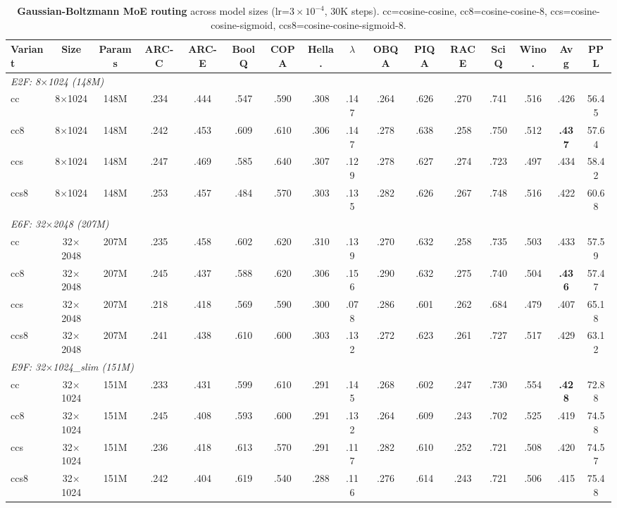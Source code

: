 \documentclass[oneside]{article}
\begin{document}
\begin{table}[t]
\centering
\caption{\textbf{Gaussian-Boltzmann MoE routing} across model sizes (lr=$3\times10^{-4}$, 30K steps). cc=cosine-cosine, cc8=cosine-cosine-8, ccs=cosine-cosine-sigmoid, ccs8=cosine-cosine-sigmoid-8.}
\label{tab:gaussboltz}
\begin{adjustbox}{max width=\textwidth}
\begin{tabular}{l|c|c|ccccccccccc|c|c}
\toprule
\textbf{Variant} & \textbf{Size} & \textbf{Params} & \textbf{ARC-C} & \textbf{ARC-E} & \textbf{BoolQ} & \textbf{COPA} & \textbf{Hella.} & \textbf{$\lambda$} & \textbf{OBQA} & \textbf{PIQA} & \textbf{RACE} & \textbf{SciQ} & \textbf{Wino.} & \textbf{Avg} & \textbf{PPL} \\
\midrule
\multicolumn{15}{l}{\textit{E2F: 8$\times$1024 (148M)}} \\
cc       & 8$\times$1024 & 148M & .234 & .444 & .547 & .590 & .308 & .147 & .264 & .626 & .270 & .741 & .516 & .426 & 56.45 \\
cc8      & 8$\times$1024 & 148M & .242 & .453 & .609 & .610 & .306 & .147 & .278 & .638 & .258 & .750 & .512 & \textbf{.437} & 57.64 \\
ccs      & 8$\times$1024 & 148M & .247 & .469 & .585 & .640 & .307 & .129 & .278 & .627 & .274 & .723 & .497 & .434 & 58.42 \\
ccs8     & 8$\times$1024 & 148M & .253 & .457 & .484 & .570 & .303 & .135 & .282 & .626 & .267 & .748 & .516 & .422 & 60.68 \\
\midrule
\multicolumn{15}{l}{\textit{E6F: 32$\times$2048 (207M)}} \\
cc       & 32$\times$2048 & 207M & .235 & .458 & .602 & .620 & .310 & .139 & .270 & .632 & .258 & .735 & .503 & .433 & 57.59 \\
cc8      & 32$\times$2048 & 207M & .245 & .437 & .588 & .620 & .306 & .156 & .290 & .632 & .275 & .740 & .504 & \textbf{.436} & 57.47 \\
ccs      & 32$\times$2048 & 207M & .218 & .418 & .569 & .590 & .300 & .078 & .286 & .601 & .262 & .684 & .479 & .407 & 65.18 \\
ccs8     & 32$\times$2048 & 207M & .241 & .438 & .610 & .600 & .303 & .132 & .272 & .623 & .261 & .727 & .517 & .429 & 63.12 \\
\midrule
\multicolumn{15}{l}{\textit{E9F: 32$\times$1024\_slim (151M)}} \\
cc       & 32$\times$1024 & 151M & .233 & .431 & .599 & .610 & .291 & .145 & .268 & .602 & .247 & .730 & .554 & \textbf{.428} & 72.88 \\
cc8      & 32$\times$1024 & 151M & .245 & .408 & .593 & .600 & .291 & .132 & .264 & .609 & .243 & .702 & .525 & .419 & 74.58 \\
ccs      & 32$\times$1024 & 151M & .236 & .418 & .613 & .570 & .291 & .117 & .282 & .610 & .252 & .721 & .508 & .420 & 74.57 \\
ccs8     & 32$\times$1024 & 151M & .242 & .404 & .619 & .540 & .288 & .116 & .276 & .614 & .243 & .721 & .506 & .415 & 75.48 \\
\bottomrule
\end{tabular}
\end{adjustbox}
\end{table}
\end{document}

